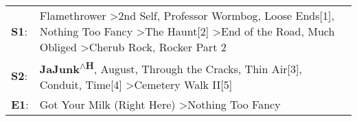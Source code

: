 \begin{supertabular}{p{0.03\textwidth}p{0.92\textwidth}}
 \textbf{S1}:  &  Flamethrower\textsuperscript{} \textgreater \enspace 2nd Self\textsuperscript{}, \enspace Professor Wormbog\textsuperscript{}, \enspace Loose Ends[1]\textsuperscript{}, \enspace Nothing Too Fancy\textsuperscript{} \textgreater \enspace The Haunt[2]\textsuperscript{} \textgreater \enspace End of the Road\textsuperscript{}, \enspace Much Obliged\textsuperscript{} \textgreater \enspace Cherub Rock\textsuperscript{}, \enspace Rocker Part 2\textsuperscript{}  \enspace  \\
 \textbf{S2}:  &                                                                                                                                                                   \textbf{JaJunk\textsuperscript{$\wedge$H}}, \enspace August\textsuperscript{}, \enspace Through the Cracks\textsuperscript{}, \enspace Thin Air[3]\textsuperscript{}, \enspace Conduit\textsuperscript{}, \enspace Time[4]\textsuperscript{} \textgreater \enspace Cemetery Walk II[5]\textsuperscript{}  \enspace  \\
 \textbf{E1}:  &                                                                                                                                                                                                                                                                                                                                                                     Got Your Milk (Right Here)\textsuperscript{} \textgreater \enspace Nothing Too Fancy\textsuperscript{}  \enspace  \\
\end{supertabular}

